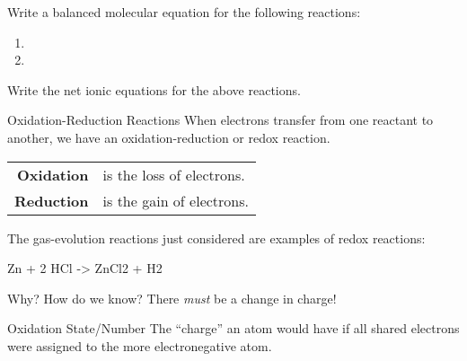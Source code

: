 \documentclass[notes=hide]{beamer}
\begin{document}

\begin{onyourown}
	Write a balanced molecular equation for the following reactions:

	\begin{enumerate}
		\item {}
			\vspace{5em}
		\item {}
			\vspace{5em}
	\end{enumerate}

	Write the net ionic equations for the above reactions.
\end{onyourown}

\clearpage

\begin{frame}{Oxidation-Reduction Reactions}
	When electrons transfer from one reactant to another, we have an
	\alert{oxidation-reduction} or \alert{redox} reaction.
	\begin{center}
		\begin{tabular} {>{\bfseries}r@{~}l}
			Oxidation & is the \alert{loss} of electrons. \\
			Reduction & is the \alert{gain} of electrons.
		\end{tabular}
	\end{center}

	\pause

	\medskip

	The gas-evolution reactions just considered are examples of redox
	reactions:
	\begin{reaction*}
		Zn\sld{} + 2 HCl\aq{} -> ZnCl2\aq{} + H2\gas{}
	\end{reaction*}

	\pause

	\begin{center}
		Why? How do we know?
		\pause
		There \emph{must} be a change in charge!
	\end{center}

	\begin{block}{Oxidation State/Number}
		The ``charge'' an atom would have if all shared electrons were
		assigned to the more electronegative atom.
	\end{block}
\end{frame}

\end{document}
